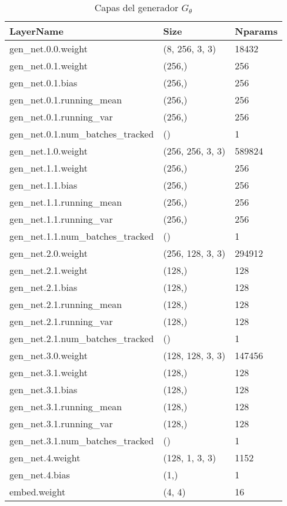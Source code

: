 \begin{table*}
    \caption{Capas del generador $G_\theta$}
    \label{tab:GenArq}
    \centering
    \begin{tabular}{l l l}
        \hline
        \textbf{LayerName} & \textbf{Size} & \textbf{Nparams} \\
        \hline
        gen\_net.0.0.weight & 	 (8, 256, 3, 3)& 	 18432\\
        gen\_net.0.1.weight & 	 (256,)& 	 256\\
        gen\_net.0.1.bias & 	 (256,)& 	 256\\
        gen\_net.0.1.running\_mean & 	 (256,)& 	 256\\
        gen\_net.0.1.running\_var & 	 (256,)& 	 256\\
        gen\_net.0.1.num\_batches\_tracked & 	 ()& 	 1\\
        gen\_net.1.0.weight & 	 (256, 256, 3, 3)& 	 589824\\
        gen\_net.1.1.weight & 	 (256,)& 	 256\\
        gen\_net.1.1.bias & 	 (256,)& 	 256\\
        gen\_net.1.1.running\_mean & 	 (256,)& 	 256\\
        gen\_net.1.1.running\_var & 	 (256,)& 	 256\\
        gen\_net.1.1.num\_batches\_tracked & 	 ()& 	 1\\
        gen\_net.2.0.weight & 	 (256, 128, 3, 3)& 	 294912\\
        gen\_net.2.1.weight & 	 (128,)& 	 128\\
        gen\_net.2.1.bias & 	 (128,)& 	 128\\
        gen\_net.2.1.running\_mean & 	 (128,)& 	 128\\
        gen\_net.2.1.running\_var & 	 (128,)& 	 128\\
        gen\_net.2.1.num\_batches\_tracked & 	 ()& 	 1\\
        gen\_net.3.0.weight & 	 (128, 128, 3, 3)& 	 147456\\
        gen\_net.3.1.weight & 	 (128,)& 	 128\\
        gen\_net.3.1.bias & 	 (128,)& 	 128\\
        gen\_net.3.1.running\_mean & 	 (128,)& 	 128\\
        gen\_net.3.1.running\_var & 	 (128,)& 	 128\\
        gen\_net.3.1.num\_batches\_tracked & 	 ()& 	 1\\
        gen\_net.4.weight & 	 (128, 1, 3, 3)& 	 1152\\
        gen\_net.4.bias & 	 (1,)& 	 1\\
        embed.weight & 	 (4, 4)& 	 16\\
        \hline
    \end{tabular}
\end{table*}

